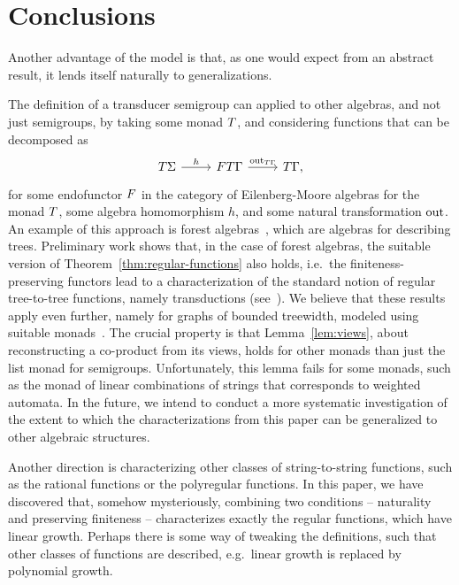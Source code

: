 \section{Conclusions}\label{sec:conclusion}

Another advantage of the model is that, as one would expect from an abstract result, it lends itself naturally to generalizations. 

The definition of a transducer semigroup can applied to other algebras, and not just semigroups, by taking some monad $\monad$, and considering functions that can be decomposed as 
\[
\begin{tikzcd}
    \functort \Sigma 
    \ar[r,"h"]
    & 
    \functor \functort \Gamma
    \ar[r,"\outfun_{\functort \Gamma}"]
    &
    \functort \Gamma,
\end{tikzcd}
\]
for some endofunctor $\functor$ in the category of Eilenberg-Moore algebras for the monad $\monad$, some algebra homomorphism $h$, and some natural transformation $\mathrm{out}$. An example of this approach is forest algebras~\cite[Section 5]{bojanczyk_recobook}, which are algebras for describing trees. Preliminary work shows that, in the case of forest algebras, the suitable version of Theorem~\ref{thm:regular-functions} also holds, i.e.~the finiteness-preserving functors lead to a characterization of the standard notion of regular tree-to-tree functions, namely \mso transductions (see~\cite{MacroMSO,FOTree}). We believe that these results apply even further, namely for graphs of bounded treewidth, modeled using suitable monads~\cite[Section 6]{bojanczyk_recobook}. The crucial property is that Lemma~\ref{lem:views}, about reconstructing a co-product from its views, holds for other monads than just the list monad for semigroups. Unfortunately, this lemma fails for some monads, such as the monad of linear combinations of strings that corresponds to weighted automata. In the future, we intend to conduct a more systematic investigation of the extent to which the characterizations from this paper can be generalized to other algebraic structures.

Another direction is characterizing other classes of string-to-string functions, such as the rational functions or the polyregular functions. In this paper, we have discovered that, somehow mysteriously, combining two conditions -- naturality and preserving finiteness -- characterizes exactly the regular functions, which have linear growth. Perhaps there is some way of tweaking the definitions, such that other classes of functions are described, e.g.~linear growth is replaced by polynomial growth.

